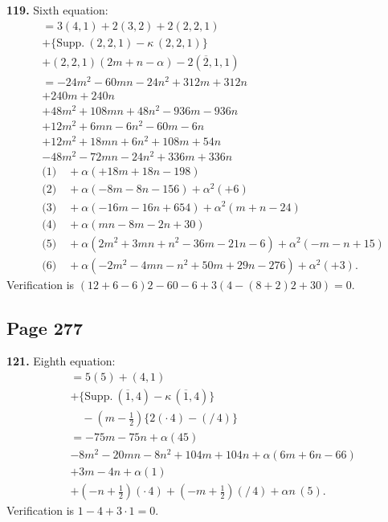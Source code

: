 \documentclass[11pt,a4paper]{article}
\theoremstyle{definition}
\begin{document}
\noindent\textbf{119.} Sixth equation:
\begin{align*}
&= 3(4,1) + 2(3,2) + 2(2,2,1) \tag{1,2,3}\\
&+ \{\text{Supp.}\ (2,2,1) - \kappa\,(2,2,1)\} \tag{4}\\
&+ (2,2,1)(2m + n - \alpha) - 2(\overline{2},1,1) \tag{5,6}\\
&= -24m^2 - 60mn - 24n^2 + 312m + 312n \tag{1}\\
&+ 240m + 240n \tag{2}\\
&+ 48m^2 + 108mn + 48n^2 - 936m - 936n \tag{3}\\
&+ 12m^2 + 6mn - 6n^2 - 60m - 6n \tag{4}\\
&+ 12m^2 + 18mn + 6n^2 + 108m + 54n \tag{5}\\
&- 48m^2 - 72mn - 24n^2 + 336m + 336n \tag{6}\\
&\text{(1)}\quad + \alpha(+18m + 18n - 198)\\
&\text{(2)}\quad + \alpha(-8m - 8n - 156) + \alpha^2(+6)\\
&\text{(3)}\quad + \alpha(-16m - 16n + 654) + \alpha^2(m + n - 24)\\
&\text{(4)}\quad + \alpha(mn - 8m - 2n + 30)\\
&\text{(5)}\quad + \alpha(2m^2 + 3mn + n^2 - 36m - 21n - 6) + \alpha^2(-m - n + 15)\\
&\text{(6)}\quad + \alpha(-2m^2 - 4mn - n^2 + 50m + 29n - 276) + \alpha^2(+3).
\end{align*}
Verification is $(12 + 6 - 6)2 - 60 - 6 + 3(4 - (8 + 2)2 + 30) = 0$.

\subsection*{Page 277}

\noindent\textbf{121.} Eighth equation:
\begin{align*}
&= 5(5) + (4,1)\\
&+ \{\text{Supp.}\ (\overline{1},4) - \kappa\,(\overline{1},4)\}\\
&\quad - (m - \tfrac{1}{2})\{2(\cdot\,4) - (/\,4)\}\\
&= -75m - 75n + \alpha(45)\\
&- 8m^2 - 20mn - 8n^2 + 104m + 104n + \alpha(6m + 6n - 66)\\
&+ 3m - 4n + \alpha(1)\\
&+ (-n + \tfrac{1}{2})(\cdot\,4) + (-m + \tfrac{1}{2})(/\,4) + \alpha n\,(5).
\end{align*}
Verification is $1 - 4 + 3 \cdot 1 = 0$.
\end{document}
